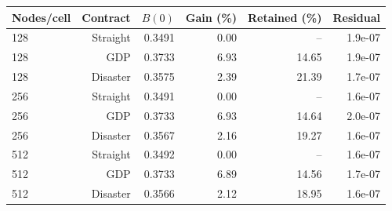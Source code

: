\begin{tabular}{@{}lrrrrr@{}}
\toprule
Nodes/cell & Contract & $B(0)$ & Gain (\%) & Retained (\%) & Residual \\ \midrule
128 & Straight & 0.3491 & 0.00 & -- & 1.9e-07 \\
128 & GDP & 0.3733 & 6.93 & 14.65 & 1.9e-07 \\
128 & Disaster & 0.3575 & 2.39 & 21.39 & 1.7e-07 \\
256 & Straight & 0.3491 & 0.00 & -- & 1.6e-07 \\
256 & GDP & 0.3733 & 6.93 & 14.64 & 2.0e-07 \\
256 & Disaster & 0.3567 & 2.16 & 19.27 & 1.6e-07 \\
512 & Straight & 0.3492 & 0.00 & -- & 1.6e-07 \\
512 & GDP & 0.3733 & 6.89 & 14.56 & 1.7e-07 \\
512 & Disaster & 0.3566 & 2.12 & 18.95 & 1.6e-07 \\
\bottomrule
\end{tabular}
